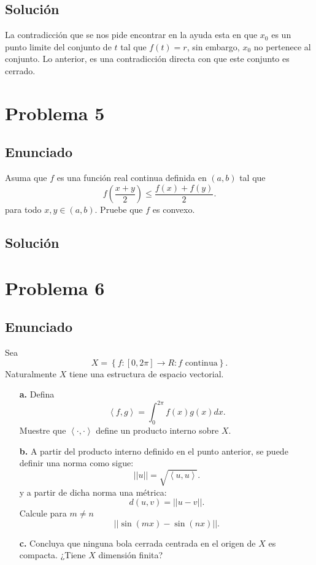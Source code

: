 \documentclass{report}
\begin{document}
\section{Solución}

La contradicción que se nos pide encontrar en la ayuda esta en que $x_0$ es un punto limite del conjunto de $t$ tal que $f\left( t \right) = r$, sin embargo, $x_0$ no pertenece al conjunto. Lo anterior, es una contradicción directa con que este conjunto es cerrado.

\chapter{Problema 5}
\section{Enunciado}

Asuma que $f$ es una función real continua definida en $\left( a, b \right) $ tal que \[
f\left( \frac{x + y}{2} \right) \le \frac{f(x) + f(y)}{2}
.\] para todo $x, y \in \left( a,b \right) $. Pruebe que $f$ es convexo.
\section{Solución}


\chapter{Problema 6}
\section{Enunciado}

Sea \[
X = \left\{ f:\left[ 0, 2\pi \right] \to R: \text{$f$ continua} \right\} 
.\] Naturalmente $X$ tiene una estructura de espacio vectorial.
\begin{enumerate}
  \item[\textbf{a.}] Defina \[
      \left<f, g \right> = \int_0^{2\pi}f\left( x \right) g\left( x \right) dx	
    .\] Muestre que $\left< \cdot, \cdot\right>$ define un producto interno sobre $X$.
  \item[\textbf{b.}] A partir del producto interno definido en el punto anterior, se puede definir una norma como sigue: \[
      \left| \left| u \right|  \right|  = \sqrt{\left<u, u \right>} 
      .\] y a partir de dicha norma una métrica: \[
      d(u, v) =  \left| \left| u - v \right|  \right| 
      .\] Calcule para $m \neq n$ \[
      \left| \left| \sin\left( mx \right) - \sin\left( nx \right)  \right|  \right| 
    .\] 
  \item[\textbf{c.}] Concluya que ninguna bola cerrada centrada en el origen de $X$ es compacta. ¿Tiene $X$ dimensión finita?
\end{enumerate}
\end{document}
